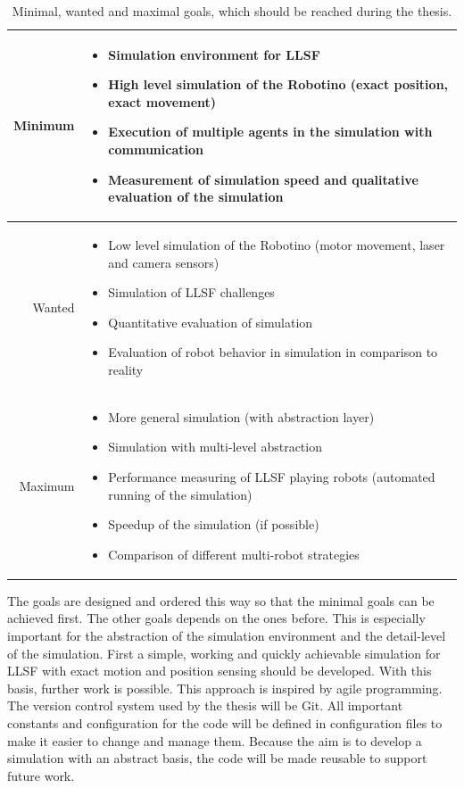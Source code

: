 \documentclass[11pt,a4paper,titlepage]{article}
\begin{document}
\begin{table}
\begin{tabular}{|r||p{10cm}|}
\hline
Minimum & \begin{itemize}
\item Simulation environment for LLSF
\item High level simulation of the Robotino (exact position, exact movement)
\item Execution of multiple agents in the simulation with communication
\item Measurement of simulation speed and qualitative evaluation of the simulation
\end{itemize}\\ \hline
Wanted & \begin{itemize}
\item Low level simulation of the Robotino (motor movement, laser and camera sensors)
\item Simulation of LLSF challenges
\item Quantitative evaluation of simulation
\item Evaluation of robot behavior in simulation in comparison to reality
\end{itemize}\\ \hline
Maximum & \begin{itemize}
\item More general simulation (with abstraction layer)
\item Simulation with multi-level abstraction
\item Performance measuring of LLSF playing robots (automated running of the simulation)
\item Speedup of the simulation (if possible)
\item Comparison of different multi-robot strategies
\end{itemize}\\
\hline
\end{tabular}
\label{Table 1}
\caption{Minimal, wanted and maximal goals, which should be reached during the thesis.}
\end{table}
The goals are designed and ordered this way so that the minimal goals can be achieved first. The other goals depends on the ones before. This is especially important for the abstraction of the simulation environment and the detail-level of the simulation. First a simple, working and quickly achievable simulation for LLSF with exact motion and position sensing should be developed. With this basis, further work is possible. This approach is inspired by agile programming. The version control system used by the thesis will be Git. All important constants and configuration for the code will be defined in configuration files to make it easier to change and manage them. Because the aim is to develop a simulation with an abstract basis, the code will be made reusable to support future work.\\
\end{document}
